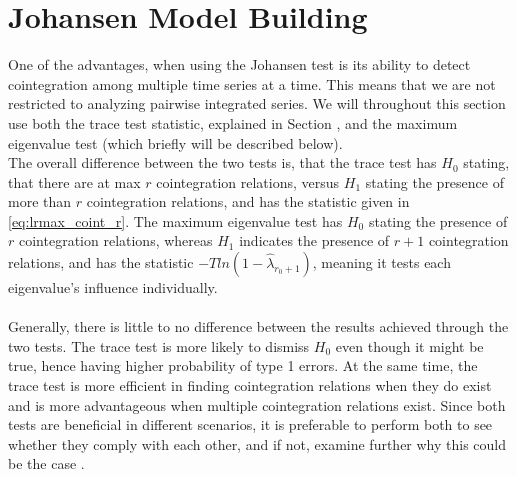 \section{Johansen Model Building}
One of the advantages, when using the Johansen test is its ability to detect cointegration among multiple time series at a time. This means that we are not restricted to analyzing pairwise integrated series. We will throughout this section use both the trace test statistic, explained in Section \cite{Johansen_test}, and the maximum eigenvalue test (which briefly will be described below). \\
The overall difference between the two tests is, that the trace test has $H_0$ stating, that there are at max $r$ cointegration relations, versus $H_1$ stating the presence of more than $r$ cointegration relations, and has the statistic given in \eqref{eq:lrmax_coint_r}. The maximum eigenvalue test has $H_0$ stating the presence of $r$ cointegration relations, whereas $H_1$ indicates the presence of $r+1$ cointegration relations, and has the statistic $-Tln(1-\hat{\lambda}_{r_0+1})$, meaning it tests each eigenvalue's influence individually.\\\\
Generally, there is little to no difference between the results achieved through the two tests. The trace test is more likely to dismiss $H_0$ even though it might be true, hence having higher probability of type 1 errors. At the same time, the trace test is more efficient in finding cointegration relations when they do exist and is more advantageous when multiple cointegration relations exist. Since both tests are beneficial in different scenarios, it is preferable to perform both to see whether they comply with each other, and if not, examine further why this could be the case \citep{johansentestdifferences}.



